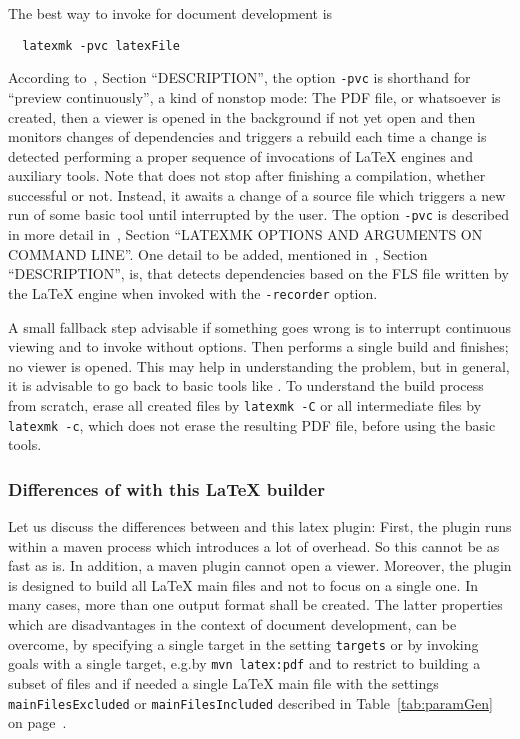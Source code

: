The best way to invoke  for document development is 
%
\begin{Verbatim}
  latexmk -pvc latexFile
\end{Verbatim}

According to~\cite{LatexMk23}, Section ``DESCRIPTION'', 
the option \texttt{-pvc} is shorthand for ``preview continuously'', 
a kind of nonstop mode: 
The PDF file, or whatsoever is created, 
then a viewer is opened in the background 
if not yet open 
and then  monitors changes of dependencies 
and triggers a rebuild each time a change is detected 
performing a proper sequence of invocations of \LaTeX{} engines and auxiliary tools. 
Note that  does not stop after finishing a compilation, 
whether successful or not. 
Instead, it awaits a change of a source file which triggers a new run of some basic tool 
until interrupted by the user. 
The option \texttt{-pvc} is described in more detail 
in~\cite{LatexMk23}, Section ``LATEXMK OPTIONS AND ARGUMENTS ON COMMAND LINE''. 
One detail to be added, mentioned in~\cite{LatexMk23}, Section ``DESCRIPTION'', is, 
that  detects dependencies 
based on the FLS file written by the \LaTeX{} engine 
when invoked with the \texttt{-recorder} option. 

A small fallback step advisable if something goes wrong 
is to interrupt continuous viewing and to invoke  without options. 
Then  performs a single build and finishes; no viewer is opened. 
This may help in understanding the problem, 
but in general, it is advisable to go back to basic tools like \lualatex. 
To understand the build process from scratch, 
erase all created files by \texttt{latexmk -C} 
or all intermediate files by \texttt{latexmk -c}, which does not erase the resulting PDF file, 
before using the basic tools. 
\medskip

\subsubsection{Differences of  with this \LaTeX{} builder}%
\label{subsubsec:latexmkDiff}


Let us discuss the differences between  and this latex plugin: 
First, the plugin runs within a maven process which introduces a lot of overhead. 
So this cannot be as fast as  is. 
In addition, a maven plugin cannot open a viewer. 
Moreover, the plugin is designed to build all \LaTeX{} main files %
and not to focus on a single one. 
In many cases, more than one output format shall be created. 
The latter properties which are disadvantages in the context of document development, 
can be overcome, by specifying a single target in the setting \texttt{targets} 
or by invoking goals with a single target, e.g.\@ by \texttt{mvn latex:pdf} 
and to restrict to building a subset of files and if needed a single \LaTeX{} main file
with the settings \texttt{mainFilesExcluded} or \texttt{mainFilesIncluded} 
described in Table~\ref{tab:paramGen} on page~\pageref{tab:paramGen}. 

